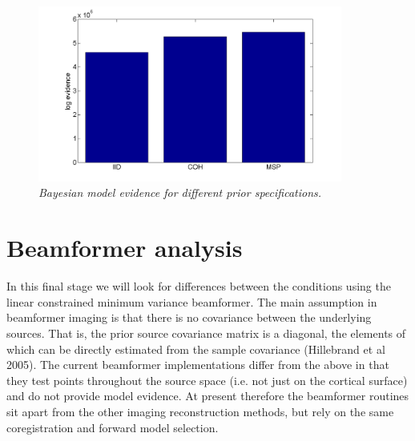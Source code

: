 \begin{figure}
\begin{center}
\includegraphics[width=100mm]{meg_sloc/slide9}
\caption{\em Bayesian model evidence for different prior specifications.\label{meg_sloc:fig:9}}
\end{center}
\end{figure}


\section{Beamformer analysis}
In this final stage we will look for differences between the conditions using the linear constrained minimum variance beamformer. The main assumption in beamformer imaging is that there is no covariance between the underlying sources. That is, the prior source covariance matrix is a diagonal, the elements of which can be directly estimated from the sample covariance (Hillebrand et al 2005).
The current beamformer implementations differ from the above in that they test points throughout the source space (i.e. not just on the cortical surface) and do not provide model evidence. At present therefore the beamformer routines sit apart from the other imaging reconstruction methods, but rely on the same coregistration and forward model selection.

